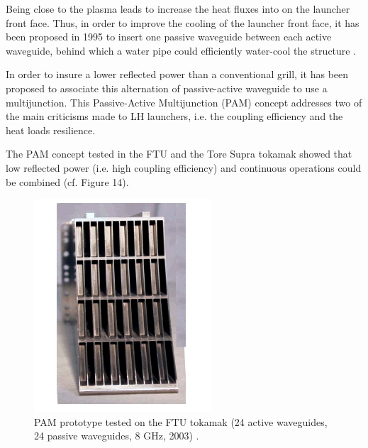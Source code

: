 Being close to the plasma leads to increase the heat fluxes into on the launcher front face. Thus, in order to improve the cooling of the launcher front face, it has been proposed in 1995 to insert one passive waveguide between each active waveguide, behind which a water pipe could efficiently water-cool the structure \parencite{Bibet1995}. 

In order to insure a lower reflected power than a conventional grill, it has been proposed to associate this alternation of passive-active waveguide to  use a multijunction. This Passive-Active Multijunction (PAM) concept addresses two of the main criticisms made to LH launchers, i.e. the coupling efficiency and the heat loads resilience. 

The PAM concept tested in the FTU and the Tore Supra tokamak showed that low reflected power (i.e. high coupling efficiency) and continuous operations could be combined (cf. Figure 14). 

\begin{figure}
\centering
\includegraphics[width=0.4\linewidth]{Figures/LHCD/Pam_FTU}
\caption{PAM prototype tested on the FTU tokamak (24 active waveguides, 24 passive waveguides, 8 GHz, 2003) \parencite{Mirizzi2003, Ridolfini2005}.}
\label{fig:pamftu}
\end{figure}



